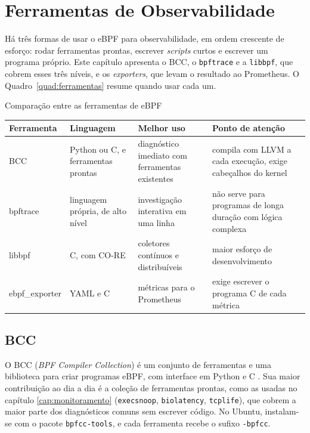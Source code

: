 \chapter{Ferramentas de Observabilidade}\label{cap:ferramentas}

Há três formas de usar o eBPF para observabilidade, em ordem crescente de esforço: rodar ferramentas prontas, escrever \textit{scripts} curtos e escrever um programa próprio. Este capítulo apresenta o BCC, o \texttt{bpftrace} e a \texttt{libbpf}, que cobrem esses três níveis, e os \textit{exporters}, que levam o resultado ao Prometheus. O Quadro~\ref{quad:ferramentas} resume quando usar cada um.

\begin{quadro}[htb]
  \caption{Comparação entre as ferramentas de eBPF}
  \label{quad:ferramentas}
  \small
  \begin{tabular}{@{}P{2.3cm}P{3.4cm}P{4.2cm}P{4.3cm}@{}}
    \toprule
    \textbf{Ferramenta} & \textbf{Linguagem} & \textbf{Melhor uso} & \textbf{Ponto de atenção} \\
    \midrule
    BCC & Python ou C, e ferramentas prontas & diagnóstico imediato com ferramentas existentes & compila com LLVM a cada execução, exige cabeçalhos do kernel \\
    bpftrace & linguagem própria, de alto nível & investigação interativa em uma linha & não serve para programas de longa duração com lógica complexa \\
    libbpf & C, com CO-RE & coletores contínuos e distribuíveis & maior esforço de desenvolvimento \\
    ebpf\_exporter & YAML e C & métricas para o Prometheus & exige escrever o programa C de cada métrica \\
    \bottomrule
  \end{tabular}
\end{quadro}

\section{BCC}\label{sec:bcc}

O BCC (\textit{BPF Compiler Collection}) é um conjunto de ferramentas e uma biblioteca para criar programas eBPF, com interface em Python e C \cite{bcc}. Sua maior contribuição ao dia a dia é a coleção de ferramentas prontas, como as usadas no capítulo \ref{cap:monitoramento} (\texttt{execsnoop}, \texttt{biolatency}, \texttt{tcplife}), que cobrem a maior parte dos diagnósticos comuns sem escrever código. No Ubuntu, instalam-se com o pacote \texttt{bpfcc-tools}, e cada ferramenta recebe o sufixo \texttt{-bpfcc}.


